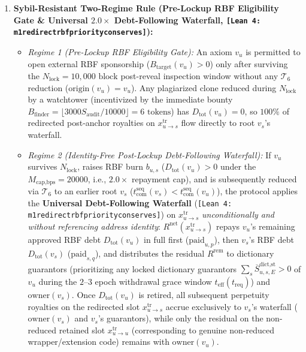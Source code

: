 \documentclass[runningheads,a4paper]{llncs}
\renewcommand{\_}{\textunderscore\allowbreak}
\newcommand{\leanref}[1]{{\footnotesize\texttt{[Lean 4: #1]}}}
\begin{document}
\begin{enumerate}
  \item \textbf{Sybil-Resistant Two-Regime Rule (Pre-Lockup RBF Eligibility Gate \& Universal $2.0\times$ Debt-Following Waterfall, \leanref{m1\_redirect\_rbf\_priority\_conserves}):}
  \begin{itemize}
    \item \emph{Regime 1 (Pre-Lockup RBF Eligibility Gate):} An axiom $v_u$ is permitted to open external RBF sponsorship ($B_{\text{target}}(v_u) > 0$) only after surviving the $N_{\text{lock}} = 10,000\text{ block}$ post-reveal inspection window without any $\mathcal{T}_6$ reduction ($\text{origin}(v_u) = v_u$). Any plagiarized clone reduced during $N_{\text{lock}}$ by a watchtower (incentivized by the immediate bounty $B_{\text{finder}} = \lfloor 3000 S_{\text{audit}} / 10000 \rfloor = 6\text{ tokens}$) has $D_{\text{tot}}(v_u) = 0$, so $100\%$ of redirected post-anchor royalties on $x_{u \to s}^{\text{tr}}$ flow directly to root $v_s$'s waterfall.
    \item \emph{Regime 2 (Identity-Free Post-Lockup Debt-Following Waterfall):} If $v_u$ survives $N_{\text{lock}}$, raises RBF burn $b_{u,s}$ ($D_{\text{tot}}(v_u) > 0$ under the $M_{\text{cap,bps}} = 20000$, i.e., $2.0\times$ repayment cap), and is subsequently reduced via $\mathcal{T}_6$ to an earlier root $v_s$ ($t_{\text{com}}^{\text{seq}}(v_s) < t_{\text{com}}^{\text{seq}}(v_u)$), the protocol applies the \textbf{Universal Debt-Following Waterfall} (\leanref{m1\_redirect\_rbf\_priority\_conserves}) on $x_{u \to s}^{\text{tr}}$ \emph{unconditionally and without referencing address identity}: $R^{\text{net}}(x_{u \to s}^{\text{tr}})$ repays $v_u$'s remaining approved RBF debt $D_{\text{tot}}(v_u)$ in full first ($\text{paid}_{u,p}$), then $v_s$'s RBF debt $D_{\text{tot}}(v_s)$ ($\text{paid}_{s,q}$), and distributes the residual $R^{\text{rem}}$ to dictionary guarantors (prioritizing any locked dictionary guarantors $\sum_s \overline{S}_{u,s,E}^{\text{dict,st}} > 0$ of $v_u$ during the $2\text{--}3$ epoch withdrawal grace window $t_{\text{eff}}(t_{\text{req}})$) and $\text{owner}(v_s)$. Once $D_{\text{tot}}(v_u)$ is retired, all subsequent perpetuity royalties on the redirected slot $x_{u \to s}^{\text{tr}}$ accrue exclusively to $v_s$'s waterfall ($\text{owner}(v_s)$ and $v_s$'s guarantors), while only the residual on the non-reduced retained slot $x_{u \to u}^{\text{tr}}$ (corresponding to genuine non-reduced wrapper/extension code) remains with $\text{owner}(v_u)$.
  \end{itemize}
\end{enumerate}
\end{document}
